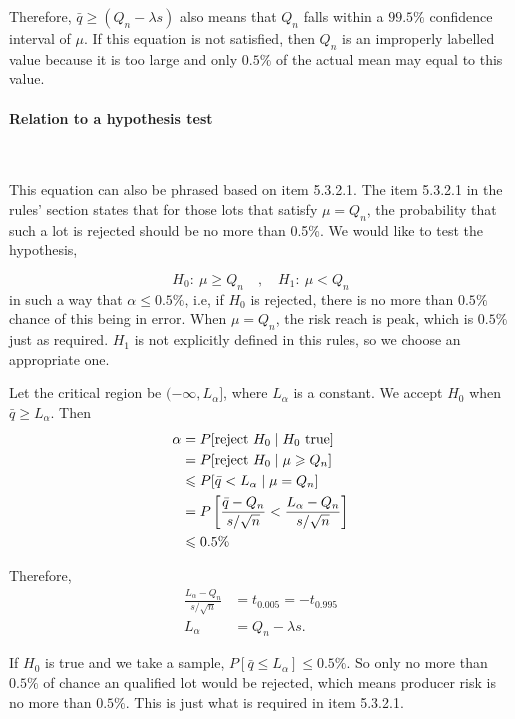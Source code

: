 \documentclass[conf]{new-aiaa}
\begin{document}
Therefore, $\bar{q} \geqslant (Q_n - \lambda s)$ also means that $Q_n$ falls within a $99.5\%$ confidence interval of $\mu$. If this equation is not satisfied, then $Q_n$ is an improperly labelled value because it is too large and only $0.5\%$ of the actual mean may equal to this value.

\paragraph{Relation to a hypothesis test}\ \medskip

This equation can also be phrased based on item 5.3.2.1. The item 5.3.2.1 in the rules' section states that for those lots that satisfy $\mu = Q_n$, the probability that such a lot is rejected should be no more than 0.5\%. We would like to test the hypothesis,

$$
    H_0:\ \mu \geqslant Q_n \quad , \quad
    H_1:\ \mu < Q_n 
$$
in such a way that $\alpha \leqslant 0.5 \%$, i.e, if $H_0$ is rejected, there is no more than $0.5\%$ chance of this being in error. When $\mu = Q_n$, the risk reach is peak, which is $0.5\%$ just as required. $H_1$ is not explicitly defined in this rules, so we choose an appropriate one. \medskip

Let the critical region be $(-\infty , L_\alpha]$, where $L_\alpha$ is a constant. We accept $H_0$ when $\bar{q} \geqslant L_\alpha$. Then
\begin{align*}
    \alpha & = P[{\rm reject\ } H_0 \mid H_0 {\rm\ true}]\\
    & = P[{\rm reject\ } H_0 \mid \mu \geqslant Q_n]\\
    &\leqslant P[\bar{q} < L_\alpha \mid \mu = Q_n] \\
    &= P\left[\frac{\bar{q} - Q_n}{s/\sqrt{n}} < \frac{L_\alpha - Q_n}{s/\sqrt{n}}\right]\\
    &\leqslant 0.5\%
\end{align*}

Therefore,
\begin{align*}
        \frac{L_\alpha - Q_n}{s/\sqrt{n}} &= t_{0.005} = - t_{0.995}\\
        L_\alpha&= Q_n - \lambda s.
\end{align*}

If $H_0$ is true and we take a sample, $P[\bar{q} \leqslant L_\alpha] \leqslant 0.5\%$. So only no more than $0.5\%$ of chance an qualified lot would be rejected, which means producer risk is no more than $0.5\%$. This is just what is required in item 5.3.2.1.
\end{document}
